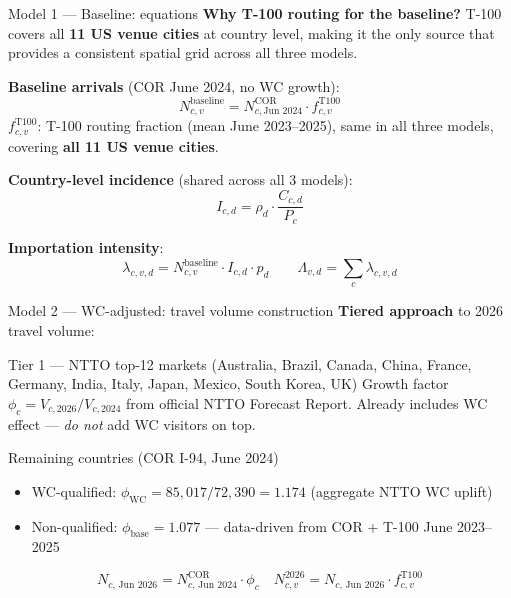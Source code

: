 \documentclass[aspectratio=169, 11pt]{beamer}
\begin{document}
\begin{frame}{Model 1 — Baseline: equations}
  \textbf{Why T-100 routing for the baseline?}
  T-100 covers all \textbf{11 US venue cities} at country level,
  making it the only source that provides a consistent spatial grid
  across all three models.

  \medskip
  \textbf{Baseline arrivals} (COR June 2024, no WC growth):
  \begin{equation}
    N_{c,v}^{\text{baseline}} = N_{c,\text{Jun 2024}}^{\text{COR}}
      \cdot f_{c,v}^{\text{T100}}
    \tag{baseline arrivals}
  \end{equation}
  {\footnotesize $f_{c,v}^{\text{T100}}$: T-100 routing fraction (mean June 2023--2025),
  same in all three models, covering \textbf{all 11 US venue cities}.}

  \textbf{Country-level incidence} (shared across all 3 models):
  \begin{equation}
    I_{c,d} = \rho_d \cdot \frac{C_{c,d}}{P_c}
    \tag{incidence}
  \end{equation}

  \textbf{Importation intensity}:
  \begin{equation}
    \lambda_{c,v,d} = N_{c,v}^{\text{baseline}} \cdot I_{c,d} \cdot p_d
    \qquad
    \Lambda_{v,d} = \sum_{c} \lambda_{c,v,d}
    \tag{baseline $\lambda$}
  \end{equation}
\end{frame}

\begin{frame}{Model 2 — WC-adjusted: travel volume construction}
  \textbf{Tiered approach} to 2026 travel volume:

  \begin{block}{Tier 1 — NTTO top-12 markets (Australia, Brazil, Canada,
    China, France, Germany, India, Italy, Japan, Mexico, South Korea, UK)}
    Growth factor $\phi_c = V_{c,2026}/V_{c,2024}$ from official
    NTTO Forecast Report. Already includes WC effect — \textit{do not}
    add WC visitors on top.
  \end{block}

  \begin{block}{Remaining countries (COR I-94, June 2024)}
    \begin{itemize}
      \item WC-qualified: $\phi_{\text{WC}} = 85{,}017/72{,}390
            = \mathbf{1.174}$ (aggregate NTTO WC uplift)
      \item Non-qualified: $\phi_{\text{base}} = \mathbf{1.077}$
            — data-driven from COR + T-100 June 2023--2025
    \end{itemize}
  \end{block}

  \vspace{-6pt}
  \[
    N_{c,\,\text{Jun 2026}} = N_{c,\,\text{Jun 2024}}^{\text{COR}} \cdot \phi_c
    \quad
    N_{c,v}^{2026} = N_{c,\,\text{Jun 2026}} \cdot f_{c,v}^{\text{T100}}
  \]
\end{frame}
\end{document}
